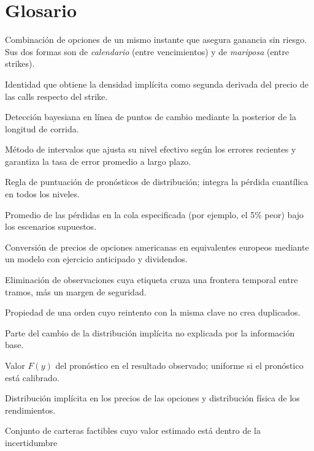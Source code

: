 \section{Glosario}\label{ap:glosario}

\begin{description}[leftmargin=0pt,itemsep=3pt,font=\sffamily\bfseries\small]
\item[Arbitraje estático.] Combinación de opciones de un mismo instante que asegura ganancia sin riesgo. Sus
dos formas son de \emph{calendario} (entre vencimientos) y de \emph{mariposa} (entre strikes).
\item[Breeden--Litzenberger.] Identidad que obtiene la densidad implícita como segunda derivada del precio
de las calls respecto del strike.
\item[BOCPD.] Detección bayesiana en línea de puntos de cambio mediante la posterior de la longitud de corrida.
\item[Conformal adaptativo.] Método de intervalos que ajusta su nivel efectivo según los errores recientes y
garantiza la tasa de error promedio a largo plazo.
\item[CRPS.] Regla de puntuación de pronósticos de distribución; integra la pérdida cuantílica en todos los niveles.
\item[CVaR.] Promedio de las pérdidas en la cola especificada (por ejemplo, el 5\% peor) bajo los escenarios supuestos.
\item[Desamericanización.] Conversión de precios de opciones americanas en equivalentes europeos mediante un
modelo con ejercicio anticipado y dividendos.
\item[Embargo y purga.] Eliminación de observaciones cuya etiqueta cruza una frontera temporal entre tramos, más
un margen de seguridad.
\item[Idempotencia.] Propiedad de una orden cuyo reintento con la misma clave no crea duplicados.
\item[Innovación.] Parte del cambio de la distribución implícita no explicada por la información base.
\item[PIT.] Valor $F(y)$ del pronóstico en el resultado observado; uniforme si el pronóstico está calibrado.
\item[$\Q$ y $\P$.] Distribución implícita en los precios de las opciones y distribución física de los
rendimientos.
\item[Región casi óptima.] Conjunto de carteras factibles cuyo valor estimado está dentro de la incertidumbre

\end{description}
